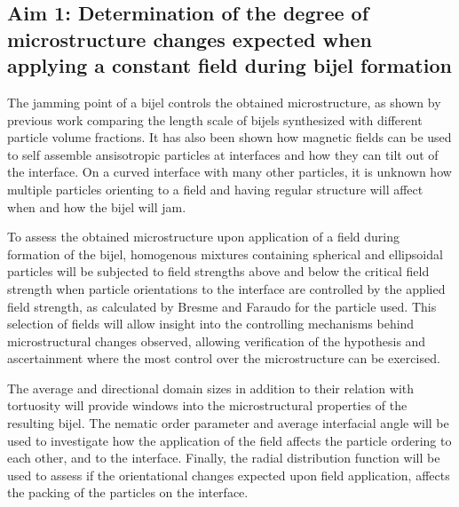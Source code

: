 
\subsection{Aim 1: Determination of the degree of microstructure changes expected when applying a constant field during bijel formation}
\label{section:aim1_desc}

The jamming point of a bijel controls the obtained microstructure, as shown by previous work comparing the length scale of bijels synthesized 
with different particle volume fractions. It has also been shown how magnetic fields can be used to self assemble ansisotropic particles at 
interfaces and how they can tilt out of the interface. \cite{davies_interface_2014, davies_assembling_2014} On a curved interface with many 
other particles, it is unknown how multiple particles orienting to a field and having regular structure will affect when and how the bijel 
will jam. \cite{bresme_orientational_2007, davies_interface_2014}

To assess the obtained microstructure upon application of a field during formation of the bijel, homogenous mixtures containing spherical and 
ellipsoidal particles will be subjected to field strengths above and below the critical field strength when particle orientations to the 
interface are controlled by the applied field strength, as calculated by Bresme and Faraudo for the particle used. This selection of fields 
will allow insight into the controlling mechanisms behind microstructural changes observed, allowing verification of the hypothesis and 
ascertainment where the most control over the microstructure can be exercised.

The average and directional domain sizes in addition to their relation with tortuosity will provide windows into the microstructural properties 
of the resulting bijel. The nematic order parameter and average interfacial angle will be used to investigate how the application of the 
field affects the particle ordering to each other, and to the interface. Finally, the radial distribution function will be used to assess 
if the orientational changes expected upon field application, affects the packing of the particles on the interface.

